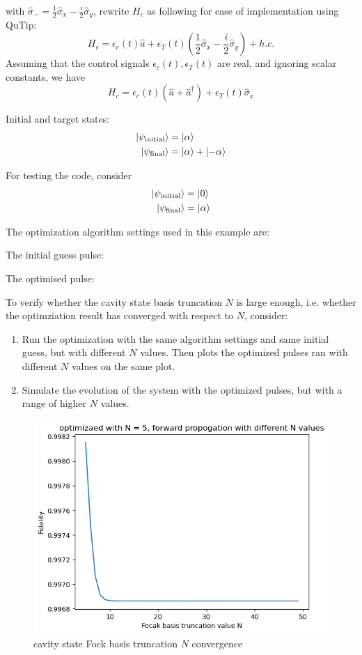 \documentclass{article}
\begin{document}
with $\hat{\sigma}_- = \frac{1}{2} \hat{\sigma}_x - \frac{i}{2}\hat{\sigma}_y$, 
rewrite $H_c$ as following for ease of implementation using QuTip:
\begin{equation}
    H_c = \epsilon_c(t) \hat{a} + \epsilon_T(t) (\frac{1}{2} \hat{\sigma}_x - \frac{i}{2}\hat{\sigma}_y) + h.c.
\end{equation}
Assuming that the control signals $\epsilon_c(t), \epsilon_T(t)$ are real, and ignoring scalar constants, we have 
$$
H_c = \epsilon_c(t) (\hat{a}+\hat{a}^{\dagger}) + \epsilon_T(t) \hat{\sigma}_x
$$

Initial and target states: 
$$
\begin{align*}
    \ket{\psi_{\text{initial}}} &= \ket{\alpha} \\
    \ket{\psi_{\text{final}}} &= \ket{\alpha} + \ket{-\alpha}
\end{align*}
$$

For testing the code, consider
$$
\begin{align*}
    \ket{\psi_{\text{initial}}} &= \ket{0} \\
    \ket{\psi_{\text{final}}} &= \ket{\alpha}
\end{align*}
$$

The optimization algorithm settings used in this example are: 

The initial guess pulse: 

The optimised pulse: 



To verify whether the cavity state basis truncation $N$ is large enough, i.e. 
whether the optimziation result has converged with respect to $N$, consider: 
\begin{enumerate}
    \item Run the optimization with the same algorithm settings and same initial guess, but with different $N$ values. 
        Then plots the optimized pulses ran with different $N$ values on the same plot. 
    \item Simulate the evolution of the system with the optimized pulses, but with a range of higher $N$ values. 
\end{enumerate}
 


\begin{figure}[H]
    \centering
    \includegraphics[width=0.6\linewidth]{vac2coherent_N_convergence.png}
    \caption{cavity state Fock basis truncation $N$ convergence}
    \label{fig:vac2coherent_N_convergence}
\end{figure}
\end{document}
